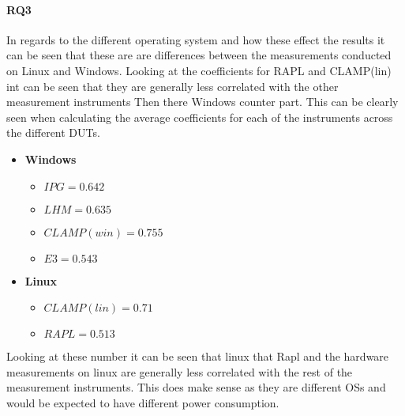 \paragraph{RQ3}
In regards to the different operating system and how these effect the results it can be seen that these are are differences between the measurements conducted on Linux and Windows.
Looking at the coefficients for RAPL and CLAMP(lin) int can be seen that they are generally less correlated with the other measurement instruments Then there Windows counter part. This can be clearly seen when calculating the average coefficients for each of the instruments across the different DUTs.
\begin{itemize}
    \item \textbf{Windows}
    \begin{itemize}
        \item $IPG = 0.642$ %
        \item $LHM = 0.635$ %
        \item $CLAMP(win) = 0.755$ %
        \item $E3 = 0.543$ %
    \end{itemize}
    \item \textbf{Linux}
    \begin{itemize}
        \item $CLAMP(lin) = 0.71$ %
        \item $RAPL = 0.513$ %
    \end{itemize}
\end{itemize}
Looking at these number it can be seen that linux that Rapl and the hardware measurements on linux are generally less correlated with the rest of the measurement instruments. This does make sense as they are different OSs and would be expected to have different power consumption.

